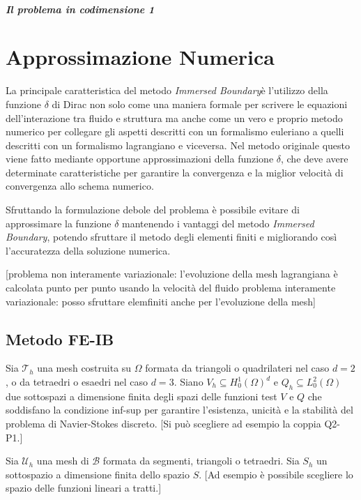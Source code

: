 \documentclass{book}
\newcommand{\IB}{\textit{Immersed Boundary}}
\begin{document}
\paragraph{Il problema in codimensione 1}

\chapter{Approssimazione Numerica}

La principale caratteristica del metodo \IB è l'utilizzo della funzione $\delta$ di Dirac non solo come una maniera formale per scrivere le equazioni dell'interazione tra fluido e struttura ma anche come un vero e proprio metodo numerico per collegare gli aspetti descritti con un formalismo euleriano a quelli descritti con un formalismo lagrangiano e viceversa. Nel metodo originale questo viene fatto mediante opportune approssimazioni della funzione $\delta$, che deve avere determinate caratteristiche per garantire la convergenza e la miglior velocità di convergenza allo schema numerico.

Sfruttando la formulazione debole del problema è possibile evitare di approssimare la funzione $\delta$ mantenendo i vantaggi del metodo \IB, potendo sfruttare il metodo degli elementi finiti e migliorando così l'accuratezza della soluzione numerica.

[problema non interamente variazionale: l'evoluzione della mesh lagrangiana è calcolata punto per punto usando la velocità del fluido
problema interamente variazionale: posso sfruttare elemfiniti anche per l'evoluzione della mesh]

\section{Metodo FE-IB}
Sia $\mathcal{T}_h$ una mesh costruita su $\Omega$ formata da triangoli o quadrilateri nel caso $d=2$, o da tetraedri o esaedri nel caso $d=3$. Siano $V_h \subseteq H^1_0(\Omega)^d$ e $Q_h \subseteq L^2_0(\Omega)$ due sottospazi a dimensione finita degli spazi delle funzioni test $V$ e $Q$ che soddisfano la condizione inf-sup per garantire l'esistenza, unicità e la stabilità del problema di Navier-Stokes discreto. [Si può scegliere ad esempio la coppia Q2-P1.]

Sia $\mathcal{U}_h$ una mesh di $\mathcal{B}$ formata da segmenti, triangoli o tetraedri. Sia $S_h$ un sottospazio a dimensione finita dello spazio $S$. [Ad esempio è possibile scegliere lo spazio delle funzioni lineari a tratti.]
\end{document}
